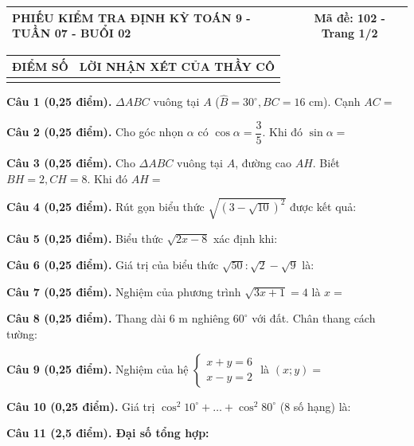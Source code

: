 \documentclass[12pt,a4paper]{article}
\begin{document}
\noindent
\begin{tabularx}{\linewidth}{|X|c|}
\hline
\textbf{PHIẾU KIỂM TRA ĐỊNH KỲ TOÁN 9 - TUẦN 07 - BUỔI 02} & \textbf{Mã đề: 102 - Trang 1/2} \\
\hline
\end{tabularx}

\vspace{1.0mm}

\noindent
\begin{tabularx}{\linewidth}{|p{3.2cm}|X|}
\hline
\centering\textbf{ĐIỂM SỐ} & \centering\textbf{LỜI NHẬN XÉT CỦA THẦY CÔ} \tabularnewline
\hline
\rule{0pt}{1.8cm} & \tabularnewline
\hline
\end{tabularx}

\vspace{1.2mm}
\noindent\textbf{Câu 1 (0,25 điểm).} $\Delta ABC$ vuông tại $A$ ($\widehat{B}=30^\circ, BC=16\text{ cm}$). Cạnh $AC =$ \par\vspace{0.6mm}
\noindent\textbf{Câu 2 (0,25 điểm).} Cho góc nhọn $\alpha$ có $\cos \alpha = \dfrac{3}{5}$. Khi đó $\sin \alpha =$ \par\vspace{0.6mm}
\noindent\textbf{Câu 3 (0,25 điểm).} Cho $\Delta ABC$ vuông tại $A$, đường cao $AH$. Biết $BH=2, CH=8$. Khi đó $AH =$ \par\vspace{0.6mm}
\noindent\textbf{Câu 4 (0,25 điểm).} Rút gọn biểu thức $\sqrt{(3 - \sqrt{10})^2}$ được kết quả: \par\vspace{0.6mm}
\noindent\textbf{Câu 5 (0,25 điểm).} Biểu thức $\sqrt{2x - 8}$ xác định khi: \par\vspace{0.6mm}
\noindent\textbf{Câu 6 (0,25 điểm).} Giá trị của biểu thức $\sqrt{50} : \sqrt{2} - \sqrt{9}$ là: \par\vspace{0.6mm}
\noindent\textbf{Câu 7 (0,25 điểm).} Nghiệm của phương trình $\sqrt{3x + 1} = 4$ là $x =$ \par\vspace{0.6mm}
\noindent\textbf{Câu 8 (0,25 điểm).} Thang dài $6\text{ m}$ nghiêng $60^\circ$ với đất. Chân thang cách tường: \par\vspace{0.6mm}
\noindent\textbf{Câu 9 (0,25 điểm).} Nghiệm của hệ $\begin{cases} x + y = 6 \\ x - y = 2 \end{cases}$ là $(x; y) =$ \par\vspace{0.6mm}
\noindent\textbf{Câu 10 (0,25 điểm).} Giá trị $\cos^2 10^\circ + \dots + \cos^2 80^\circ$ (8 số hạng) là: \par\vspace{0.6mm}
\vspace{0.8mm}
\noindent\textbf{Câu 11 (2,5 điểm). Đại số tổng hợp:}
\vspace{0.6mm}
\end{document}
